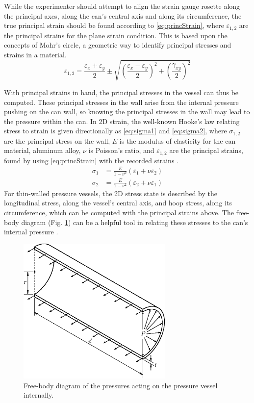 \documentclass[10pt,journal,letterpaper]{IEEEtran}
\begin{document}
While the experimenter should attempt to align the strain gauge rosette along the principal axes, along the can's central axis and along its circumference, the true principal strain should be found according to \eqref{eq:princStrain}, where $\varepsilon_{1,2}$ are the principal strains for the plane strain condition.
This is based upon the concepts of Mohr’s circle, a geometric way to identify principal stresses and strains in a material.
\begin{equation}
\label{eq:princStrain}
\varepsilon_{1,2}=\frac{\varepsilon_x+\varepsilon_y}{2} \pm \sqrt{\left(\frac{\varepsilon_x-\varepsilon_y}{2}\right)^2+\left(\frac{\gamma_{xy}}{2}\right)^2}
\end{equation}

With principal strains in hand, the principal stresses in the vessel can thus be computed.
These principal stresses in the wall arise from the internal pressure pushing on the can wall, so knowing the principal stresses in the wall may lead to the pressure within the can.
In 2D strain, the well-known Hooke’s law relating stress to strain is given directionally as \eqref{eq:sigma1} and \eqref{eq:sigma2}, where $\sigma_{1,2}$ are the principal stress on the wall, $E$ is the modulus of elasticity for the can material, aluminum alloy, $\nu$ is Poisson’s ratio, and $\varepsilon_{1,2}$ are the principal strains, found by using \eqref{eq:princStrain} with the recorded strains \cite{b1}.
\begin{subequations}
\label{eq:sigmas}
\begin{align}
\sigma_1&=\frac{E}{1-\nu^2}\left(\varepsilon_1+\nu\varepsilon_2\right) \label{eq:sigma1} \\
\sigma_2&=\frac{E}{1-\nu^2}\left(\varepsilon_2+\nu\varepsilon_1\right) \label{eq:sigma2}
\end{align}
\end{subequations}
For thin-walled pressure vessels, the 2D stress state is described by the longitudinal stress, along the vessel's central axis, and hoop stress, along its circumference, which can be computed with the principal strains above.
The free-body diagram (Fig. \ref{fig:PVessel}) can be a helpful tool in relating these stresses to the can's internal pressure \cite{b1}.

\begin{figure}[H]
\centering
\includegraphics[width=3in]{PVessel}
\caption{Free-body diagram of the pressures acting on the pressure vessel internally.}
\label{fig:PVessel}
\end{figure}
\end{document}
